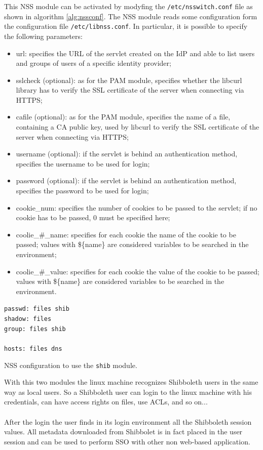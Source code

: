 This NSS module can be activated by modyfing the \texttt{/etc/nsswitch.conf} file as shown in algorithm \ref{alg:nssconf}.
The NSS module reads some configuration form the configuration file \texttt{/etc/libnss.conf}.
In particular, it is possible to specify the following parameters:
\begin{itemize}
\item url: specifies the URL of the servlet created on the IdP and able to list users and groups of users of a specific identity provider;
\item sslcheck (optional): as for the PAM module, specifies whether the libcurl library has to verify the SSL certificate of the server when
connecting via HTTPS;
\item cafile (optional): as for the PAM module, specifies the name of a file, containing a CA public key, used by libcurl to verify the SSL
certificate of the server when connecting via HTTPS;
\item username (optional): if the servlet is behind an authentication method, specifies the username to be used for login;
\item password (optional): if the servlet is behind an authentication method, specifies the password to be used for login;
\item cookie\_num: specifies the number of cookies to be passed to the servlet; if no cookie has to be passed, 0 must be specified here;
\item coolie\_\#\_name: specifies for each cookie the name of the cookie to be passed; values with \$\{name\} are considered variables to
be searched in the environment;
\item coolie\_\#\_value: specifies for each cookie the value of the cookie to be passed; values with \$\{name\} are considered variables to
be searched in the environment.
\end{itemize}

\begin{algorithm}[t]
\SetAlgoNoLine
\texttt{passwd:     files shib}\\
\texttt{shadow:     files}\\
\texttt{group:      files shib}\\
\texttt{}\\
\texttt{hosts:      files dns}
\caption{NSS configuration to use the \texttt{shib} module.}
\label{alg:nssconf}
\end{algorithm}

With this two modules the linux machine recognizes Shibboleth users in the same way as local users.
So a Shibboleth user can login to the linux machine with his credentials, can have access rights on files, use ACLs, and so on...\\
\\
After the login the user finds in its login environment all the Shibboleth session values.
All metadata downloaded from Shibbolet is in fact placed in the user session and can be used to perform SSO with other non web-based
application.

